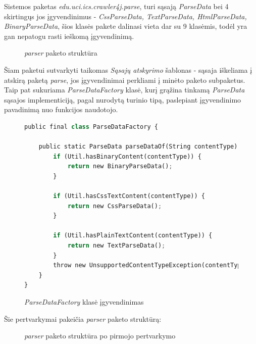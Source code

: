 Sistemos paketas \textit{edu.uci.ics.crawler4j.parse}, turi sąsają \textit{ParseData} bei 4 skirtingųs jos įgyvendinimus - \textit{CssParseData, TextParseData, HtmlParseData, BinaryParseData},
šios klasės pakete dalinasi vieta dar su 9 klasėmis, todėl yra gan nepatogu rasti ieškomą įgyvendinimą.
\begin{figure}[H]
    \snugshade
    \endsnugshade
    \caption{\textit{parser} paketo struktūra}
\end{figure}
Šiam paketui sutvarkyti taikomas \textit{Sąsajų atskyrimo} šablonas - sąsaja iškeliama į atskirą paketą \textit{parse}, jos įgyvendinimai perkliami į minėto
paketo subpaketus.
Taip pat sukuriama \textit{ParseDataFactory} klasė, kurį grąžina tinkamą \textit{ParseData} sąsajos implementiciją, pagal nurodytą turinio tipą, paslepiant įgyvendinimo pavadinimą nuo
funkcijos naudotojo.
\begin{figure}[H]
    \begin{lstlisting}[language=Python]
public final class ParseDataFactory {

    public static ParseData parseDataOf(String contentType) {
        if (Util.hasBinaryContent(contentType)) {
            return new BinaryParseData();
        }

        if (Util.hasCssTextContent(contentType)) {
            return new CssParseData();
        }

        if (Util.hasPlainTextContent(contentType)) {
            return new TextParseData();
        }
        throw new UnsupportedContentTypeException(contentType);
    }
}
    \end{lstlisting}
    \caption{\textit{ParseDataFactory} klasė įgyvendinimas }
\end{figure}
Šie pertvarkymai pakeičia \textit{parser} paketo struktūrą:
\begin{figure}[H]
    \snugshade
    \endsnugshade
    \caption{\textit{parser} paketo struktūra po pirmojo pertvarkymo}
\end{figure}
